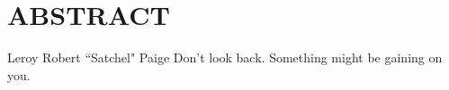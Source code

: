 \chapter*{{\bf ABSTRACT}}


\begin{Aphorism}{Leroy Robert ``Satchel" Paige}
Don't look back. Something might be gaining on you.
\end{Aphorism}

\vspace{2em}
